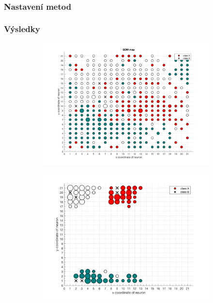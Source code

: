 \documentclass[thesis=M,czech]{FITthesis}[2012/06/26]
\begin{document}
\subsubsection*{Nastavení metod}
\subsubsection*{Výsledky}

\begin{figure}
\centering
\begin{subfigure}{.5\textwidth}
  \centering
  \includegraphics[width=.99\linewidth]{db_ep_acdc_som}
  \caption{}
  \label{fig:sub1}
\end{subfigure}%
\begin{subfigure}{.5\textwidth}
  \centering
  \includegraphics[width=.99\linewidth]{db_ep_acdc_crsom}
  \caption{}
  \label{fig:sub2}
\end{subfigure}
\caption{}
\label{fig:top}
\end{figure}
\end{document}
